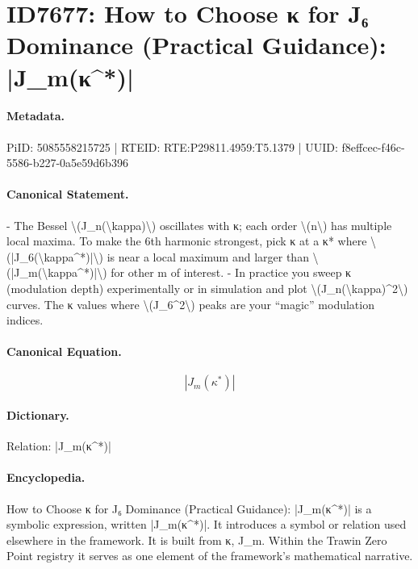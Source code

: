 \section*{ID7677: How to Choose κ for J₆ Dominance (Practical Guidance): |J\_m(κ\textasciicircum{}*)|}
\paragraph{Metadata.}
PiID: 5085558215725 | RTEID: RTE:P29811.4959:T5.1379 | UUID: f8effcec-f46c-5586-b227-0a5e59d6b396

\paragraph{Canonical Statement.}
- The Bessel \textbackslash{}(J\_n(\textbackslash{}kappa)\textbackslash{}) oscillates with κ; each order \textbackslash{}(n\textbackslash{}) has multiple local maxima. To make the 6th harmonic strongest, pick κ at a κ* where \textbackslash{}(|J\_6(\textbackslash{}kappa\textasciicircum{}*)|\textbackslash{}) is near a local maximum and larger than \textbackslash{}(|J\_m(\textbackslash{}kappa\textasciicircum{}*)|\textbackslash{}) for other m of interest. - In practice you sweep κ (modulation depth) experimentally or in simulation and plot \textbackslash{}(J\_n(\textbackslash{}kappa)\textasciicircum{}2\textbackslash{}) curves. The κ values where \textbackslash{}(J\_6\textasciicircum{}2\textbackslash{}) peaks are your “magic” modulation indices.

\paragraph{Canonical Equation.}
\[
|J_m(\kappa^*)|
\]

\paragraph{Dictionary.}
Relation: |J\_m(κ\textasciicircum{}*)|

\paragraph{Encyclopedia.}
How to Choose κ for J₆ Dominance (Practical Guidance): |J\_m(κ\textasciicircum{}*)| is a symbolic expression, written |J\_m(κ\textasciicircum{}*)|. It introduces a symbol or relation used elsewhere in the framework. It is built from κ, J\_m. Within the Trawin Zero Point registry it serves as one element of the framework's mathematical narrative.
